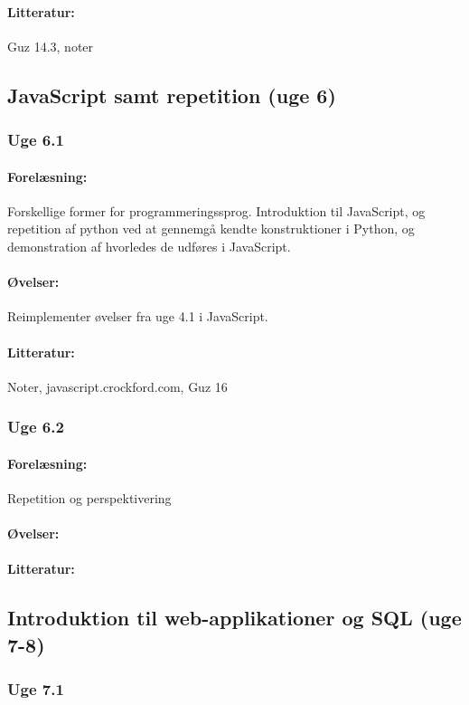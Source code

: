 \documentclass[12pt]{article}
\begin{document}
\paragraph{Litteratur:} Guz 14.3, noter

\subsection{JavaScript samt repetition (uge 6)}
\subsubsection{Uge 6.1}
\paragraph{Forelæsning:} 
Forskellige former for programmeringssprog.
Introduktion til JavaScript, og repetition af python ved at gennemgå kendte konstruktioner i Python, og demonstration af hvorledes de udføres i JavaScript.
\paragraph{Øvelser:}
Reimplementer øvelser fra uge 4.1 i JavaScript.
\paragraph{Litteratur:} Noter, javascript.crockford.com, Guz 16

\subsubsection{Uge 6.2}
\paragraph{Forelæsning:} 
Repetition og perspektivering
\paragraph{Øvelser:}

\paragraph{Litteratur:}

\subsection{Introduktion til web-applikationer og SQL (uge 7-8)}
\subsubsection{Uge 7.1}
\end{document}
